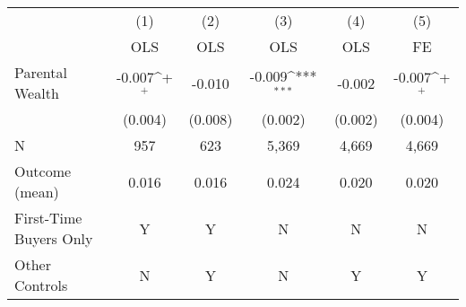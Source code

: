 {
\def\sym#1{\ifmmode^{#1}\else\(^{#1}\)\fi}
\begin{tabular}{l*{5}{c}}
\toprule
                &\multicolumn{1}{c}{(1)}&\multicolumn{1}{c}{(2)}&\multicolumn{1}{c}{(3)}&\multicolumn{1}{c}{(4)}&\multicolumn{1}{c}{(5)}\\
                &\multicolumn{1}{c}{OLS}&\multicolumn{1}{c}{OLS}&\multicolumn{1}{c}{OLS}&\multicolumn{1}{c}{OLS}&\multicolumn{1}{c}{FE}\\
\midrule
\;Parental Wealth&   -0.007\sym{+}  &   -0.010         &   -0.009\sym{***}&   -0.002         &   -0.007\sym{+}  \\
                &  (0.004)         &  (0.008)         &  (0.002)         &  (0.002)         &  (0.004)         \\
\midrule
N               &      957         &      623         &    5,369         &    4,669         &    4,669         \\
Outcome (mean)  &    0.016         &    0.016         &    0.024         &    0.020         &    0.020         \\
First-Time Buyers Only&        Y         &        Y         &        N         &        N         &        N         \\
Other Controls  &        N         &        Y         &        N         &        Y         &        Y         \\
\bottomrule
\end{tabular}
}
